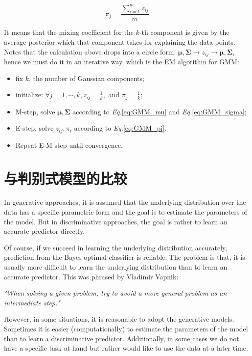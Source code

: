 \documentclass{article}
\begin{document}
	\begin{equation}
	\label{eq:GMM_pi}
	\pi_j=\frac{\sum_{i=1}^m z_{ij}}{m}
	\end{equation}
	
	It means that the mixing coefficient for the $k$-th component is given by the average posterior which that component takes for explaining the data points. Notes that the calculation above drops into a circle form: $\bm{\mu}, \bm{\Sigma} \rightarrow z_{ij} \rightarrow \bm{\mu}, \bm{\Sigma}$, hence we must do it in an iterative way, which is the EM algorithm for GMM:
	
	
	\begin{minipage}{.9\linewidth}
    \begin{itemize}
	\item fix $k$, the number of Gaussian components;
	\item initialize: $\forall j=1,\cdots,k, z_{ij}=\frac{1}{k},$ and $\pi_j=\frac{1}{k}$;
	\item M-step, solve $\bm{\mu}, \bm{\Sigma}$ according to \textit{Eq.}\ref{eq:GMM_mu} and \textit{Eq.}\ref{eq:GMM_sigma};
	\item E-step, solve $z_{ij},\pi_i$ according to \textit{Eq.}\ref{eq:GMM_pi}.
	\item Repeat E-M step until convergence.
	\end{itemize}
  	\end{minipage}

		
\section{与判别式模型的比较}
	\label{sec:final}
	In generative approaches, it is assumed that the underlying distribution over the data has a specific parametric form and the goal is to estimate the parameters of the model. But in discriminative approaches, the goal is rather to learn an accurate predictor directly. 
	
	Of course, if we succeed in learning the underlying distribution accurately, prediction from the Bayes optimal classifier is reliable. The problem is that, it is usually more difficult to learn the underlying distribution than to learn an accurate predictor. This was phrased by Vladimir Vapnik:
	\begin{center}
	\textit{"When solving a given problem, try to avoid a more general problem as an intermediate step."}
	\end{center}

	However, in some situations, it is reasonable to adopt the generative models. Sometimes it is easier (computationally) to estimate the parameters of the model than to learn a discriminative predictor. Additionally, in some cases we do not have a specific task at hand but rather would like to use the data at a later time.
	
\end{document}

